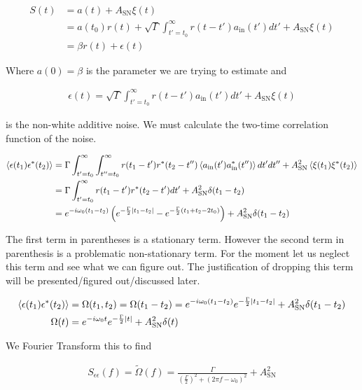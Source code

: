 \documentclass[12pt]{article}
\begin{document}
\begin{align}
S(t) &= a(t) + A_{\text{SN}} \xi(t)\\
&= a(t_0) r(t) + \sqrt{\Gamma} \int_{t'=t_0}^{\infty} r(t-t')a_{\text{in}}(t')dt' + A_{\text{SN}}\xi(t)\\
&= \beta r(t) + \epsilon(t)
\end{align}

Where $a(0) = \beta$ is the parameter we are trying to estimate and

\begin{align}
\epsilon(t) = \sqrt{\Gamma} \int_{t'=t_0}^{\infty} r(t-t')a_{\text{in}}(t')dt' + A_{\text{SN}}\xi(t)
\end{align}

is the non-white additive noise. We must calculate the two-time correlation function of the noise.

\begin{align}
\Braket{\epsilon(t_1)\epsilon^*(t_2)} &= \Gamma \int_{t'=t_0}^{\infty}\int_{t''=t_0}^{\infty} r(t_1-t')r^*(t_2-t'')\Braket{a_{\text{in}}(t')a_{\text{in}}^*(t'')}dt'dt'' + A_{\text{SN}}^2 \Braket{\xi(t_1)\xi^*(t_2)}\\
&= \Gamma \int_{t'=t_0}^{\infty} r(t_1-t')r^*(t_2-t') dt' + A_{\text{SN}}^2\delta(t_1-t_2)\\
&= e^{-i\omega_0(t_1-t_2)}\left(e^{-\frac{\Gamma}{2}\lvert t_1 - t_2\rvert} - e^{-\frac{\Gamma}{2}(t_1+t_2-2t_0)} \right) + A_{\text{SN}}^2\delta(t_1-t_2)
\end{align}

The first term in parentheses is a stationary term. However the second term in parenthesis is a problematic non-stationary term. For the moment let us neglect this term and see what we can figure out. The justification of dropping this term will be presented/figured out/discussed later.

\begin{align}
\Braket{\epsilon(t_1)\epsilon^*(t_2)} &= \Omega(t_1,t_2) = \Omega(t_1-t_2) = e^{-i\omega_0(t_1-t_2)}e^{-\frac{\Gamma}{2}\lvert t_1 - t_2 \rvert} + A_{\text{SN}}^2\delta(t_1-t_2)\\
\Omega(t) &= e^{-i\omega_0t}e^{-\frac{\Gamma}{2}\lvert t \rvert} + A_{\text{SN}}^2 \delta(t)
\end{align}

We Fourier Transform this to find

\begin{align}
S_{\epsilon \epsilon}(f) = \tilde{\Omega}(f) = \frac{\Gamma}{\left(\frac{\Gamma}{2}\right)^2 + (2\pi f - \omega_0)^2} + A_{\text{SN}}^2
\end{align}
\end{document}
